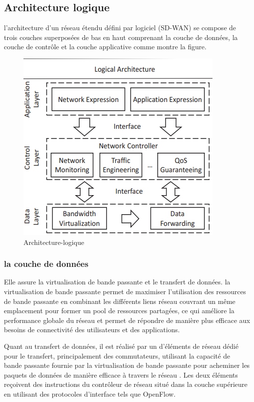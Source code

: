 \subsection{Architecture logique  }
l'architecture d'un réseau étendu défini par logiciel (SD-WAN) se compose de trois couches superposées de bas en haut comprenant la couche de données, la couche de contrôle et la couche applicative comme montre la figure.
\begin{figure} [H]
	\begin{center}
		\centering
		\hspace*{-0.5cm}
		\includegraphics{../image/arch log}
	\end{center}
	\caption{Architecture-logique}
\end{figure} 
\subsubsection{    la couche de données }

Elle assure la virtualisation de bande passante et le transfert de données. la virtualisation de bande passante permet de maximiser l'utilisation des ressources de bande passante en combinant les différents  liens réseau couvrant un même emplacement pour former un pool de ressources partagées, ce qui améliore la performance globale du réseau et permet de répondre de manière plus efficace aux besoins de connectivité des utilisateurs et des applications.

Quant au transfert de données, il est réalisé par un d'éléments de réseau dédié pour le  transfert, principalement des commutateurs, utilisant la capacité de bande passante fournie par la virtualisation de bande passante pour acheminer les paquets de données de manière efficace à travers le réseau . Les deux éléments reçoivent des instructions du contrôleur de réseau situé dans la couche supérieure en utilisant des protocoles d'interface tels que OpenFlow. 

